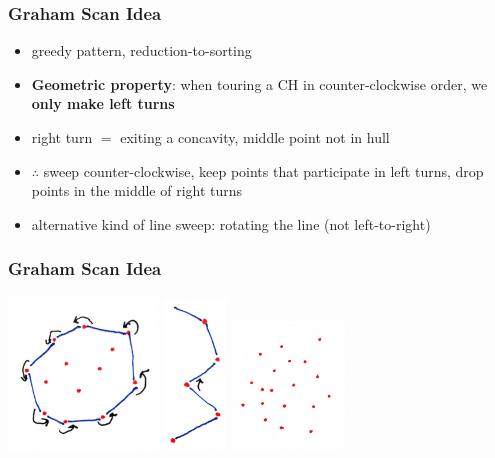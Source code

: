 \documentclass{beamer}
\begin{document}
\begin{frame} \frametitle{Graham Scan Idea}
\begin{itemize}
  \item greedy pattern, reduction-to-sorting
  \item \textbf{Geometric property}: when touring a CH in counter-clockwise order, we
    \textbf{only make left turns}
  \item right turn $=$ exiting a concavity, middle point not in hull
  \item $\therefore$ sweep counter-clockwise, keep points that participate in left
    turns, drop points in the middle of right turns 
  \item alternative kind of line sweep: rotating the line (not left-to-right)
\end{itemize}
\end{frame}

\begin{frame} \frametitle{Graham Scan Idea}
  \begin{center}
    \includegraphics[width=4cm]{convex_hull_left_turns.jpg}
    \hspace{.5cm}
    \includegraphics[height=4cm]{convex_hull_concavity.jpg}
    \hspace{.5cm}
    \includegraphics[width=3cm]{convex_hull_input.jpg}
  \end{center}
\end{frame}
\end{document}
